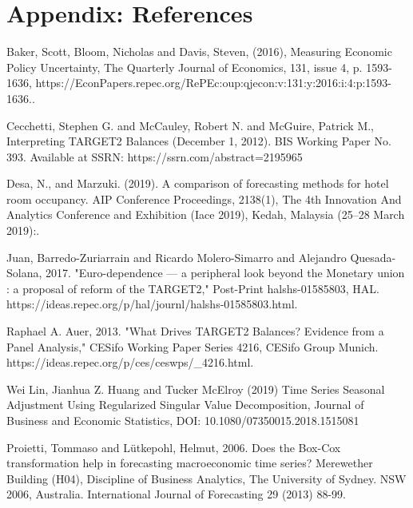 \documentclass[12pt]{article}
\begin{document}

\setlength\bibsep{0pt}



\clearpage
\onehalfspacing
\section*{Appendix: References} \label{sec:references}

Baker, Scott, Bloom, Nicholas and Davis, Steven, (2016), Measuring Economic Policy Uncertainty, The Quarterly Journal of Economics, 131, issue 4, p. 1593-1636, \newline https://EconPapers.repec.org/RePEc:oup:qjecon:v:131:y:2016:i:4:p:1593-1636..

Cecchetti, Stephen G. and McCauley, Robert N. and McGuire, Patrick M., Interpreting TARGET2 Balances (December 1, 2012). BIS Working Paper No. 393. Available at SSRN: https://ssrn.com/abstract=2195965 

Desa, N., and Marzuki. (2019). A comparison of forecasting methods for hotel room occupancy. AIP Conference Proceedings, 2138(1), The 4th Innovation And Analytics Conference and Exhibition (Iace 2019), Kedah, Malaysia (25–28 March 2019):.

Juan, Barredo-Zuriarrain and Ricardo Molero-Simarro and Alejandro Quesada-Solana, 2017. "Euro-dependence — a peripheral look beyond the Monetary union : a proposal of reform of the TARGET2," Post-Print halshs-01585803, HAL. \newline https://ideas.repec.org/p/hal/journl/halshs-01585803.html. 

Raphael A. Auer, 2013. "What Drives TARGET2 Balances? Evidence from a Panel Analysis," CESifo Working Paper Series 4216, CESifo Group Munich. \newline https://ideas.repec.org/p/ces/ceswps/\_4216.html. 

Wei Lin, Jianhua Z. Huang and Tucker McElroy (2019) Time Series Seasonal Adjustment Using Regularized Singular Value Decomposition, Journal of Business and Economic Statistics, DOI: 10.1080/07350015.2018.1515081

Proietti, Tommaso and Lütkepohl, Helmut, 2006. Does the Box-Cox transformation help in forecasting macroeconomic time series? Merewether Building (H04), Discipline of Business Analytics, The University of Sydney. NSW 2006, Australia. International Journal of Forecasting 29 (2013) 88-99. 
\end{document}
